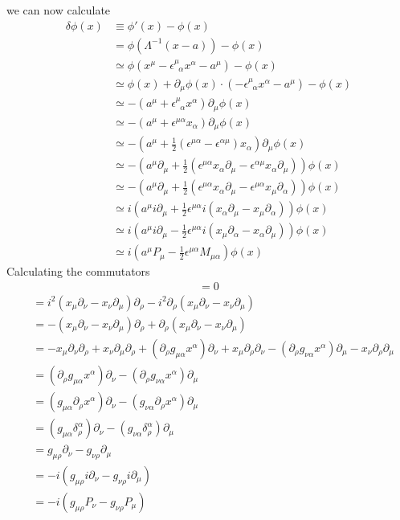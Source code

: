 \documentclass[../main.tex]{subfiles}
\begin{document}
we can now calculate 
\begin{align}
\delta\phi(x)
&\equiv\phi'(x)-\phi(x)\\
&=\phi(\Lambda^{-1}(x-a))-\phi(x)\\
&\simeq\phi(x^\mu-\epsilon^\mu_{\;\;\alpha}x^\alpha-a^\mu)-\phi(x)\\
&\simeq\phi(x)+\partial_\mu\phi(x)\cdot(-\epsilon^\mu_{\;\;\alpha}x^\alpha-a^\mu)-\phi(x)\\
&\simeq-(a^\mu+\epsilon^\mu_{\;\;\alpha}x^\alpha)\partial_\mu\phi(x)\\
&\simeq-(a^\mu+\epsilon^{\mu\alpha}x_\alpha)\partial_\mu\phi(x)\\
&\simeq-\left(a^\mu+\frac{1}{2}\left(\epsilon^{\mu\alpha}-\epsilon^{\alpha\mu}\right)x_\alpha\right)\partial_\mu\phi(x)\\
&\simeq-\left(a^\mu\partial_\mu+\frac{1}{2}\left(\epsilon^{\mu\alpha}x_\alpha\partial_\mu-\epsilon^{\alpha\mu}x_\alpha\partial_\mu\right)\right)\phi(x)\\
&\simeq-\left(a^\mu\partial_\mu+\frac{1}{2}\left(\epsilon^{\mu\alpha}x_\alpha\partial_\mu-\epsilon^{\mu\alpha}x_\mu\partial_\alpha\right)\right)\phi(x)\\
&\simeq i\left(a^\mu i\partial_\mu+\frac{1}{2}\epsilon^{\mu\alpha}i\left(x_\alpha\partial_\mu-x_\mu\partial_\alpha\right)\right)\phi(x)\\
&\simeq i\left(a^\mu i\partial_\mu-\frac{1}{2}\epsilon^{\mu\alpha}i\left(x_\mu\partial_\alpha-x_\alpha\partial_\mu\right)\right)\phi(x)\\
&\simeq i\left(a^\mu P_\mu-\frac{1}{2}\epsilon^{\mu\alpha}M_{\mu\alpha}\right)\phi(x)
\end{align}
Calculating the commutators
\begin{align}
[P_\mu,P_\nu]=0
\end{align}
\begin{align}
[M_{\mu\nu},P_\rho]
&=i^2(x_\mu\partial_\nu-x_\nu\partial_\mu)\partial_\rho-i^2\partial_\rho(x_\mu\partial_\nu-x_\nu\partial_\mu)\\
&=-(x_\mu\partial_\nu-x_\nu\partial_\mu)\partial_\rho+\partial_\rho(x_\mu\partial_\nu-x_\nu\partial_\mu)\\
&=-x_\mu\partial_\nu\partial_\rho+x_\nu\partial_\mu\partial_\rho+ (\partial_\rho g_{\mu\alpha}x^\alpha)\partial_\nu+x_\mu\partial_\rho\partial_\nu
-(\partial_\rho g_{\nu\alpha}x^\alpha)\partial_\mu-x_\nu\partial_\rho\partial_\mu\\
&=(\partial_\rho g_{\mu\alpha}x^\alpha)\partial_\nu
-(\partial_\rho g_{\nu\alpha}x^\alpha)\partial_\mu\\
&=(g_{\mu\alpha}\partial_\rho x^\alpha)\partial_\nu
-(g_{\nu\alpha}\partial_\rho x^\alpha)\partial_\mu\\
&=(g_{\mu\alpha}\delta^\alpha_\rho)\partial_\nu
-(g_{\nu\alpha}\delta^\alpha_\rho)\partial_\mu\\
&=g_{\mu\rho}\partial_\nu
-g_{\nu\rho}\partial_\mu\\
&=-i(g_{\mu\rho}i\partial_\nu
-g_{\nu\rho}i\partial_\mu)\\
&=-i(g_{\mu\rho}P_\nu
-g_{\nu\rho}P_\mu)
\end{align}
\end{document}
